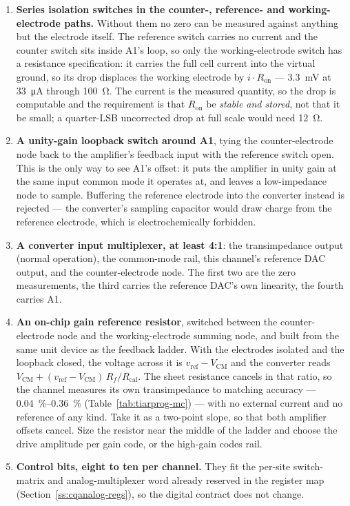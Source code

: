 \begin{enumerate}[label=C\arabic*., leftmargin=*, itemsep=2pt]
\item \textbf{Series isolation switches in the counter-, reference- and
  working-electrode paths.} Without them no zero can be measured against
  anything but the electrode itself. The reference switch carries no current and
  the counter switch sits inside A1's loop, so only the working-electrode switch
  has a resistance specification: it carries the full cell current into the
  virtual ground, so its drop displaces the working electrode by
  \(i\!\cdot\!R_{\mathrm{on}}\) --- \SI{3.3}{\milli\volt} at
  \SI{33}{\micro\ampere} through \SI{100}{\ohm}. The current is the measured
  quantity, so the drop is computable and the requirement is that
  \(R_{\mathrm{on}}\) be \emph{stable and stored}, not that it be small; a
  quarter-LSB uncorrected drop at full scale would need \SI{12}{\ohm}.
\item \textbf{A unity-gain loopback switch around A1}, tying the
  counter-electrode node back to the amplifier's feedback input with the
  reference switch open. This is the only way to see A1's offset: it puts the
  amplifier in unity gain at the same input common mode it operates at, and
  leaves a low-impedance node to sample. Buffering the reference electrode into
  the converter instead is rejected --- the converter's sampling capacitor would
  draw charge from the reference electrode, which is electrochemically
  forbidden.
\item \textbf{A converter input multiplexer, at least 4:1}: the transimpedance
  output (normal operation), the common-mode rail, this channel's reference DAC
  output, and the counter-electrode node. The first two are the zero
  measurements, the third carries the reference DAC's own linearity, the fourth
  carries A1.
\item \textbf{An on-chip gain reference resistor}, switched between the
  counter-electrode node and the working-electrode summing node, and built from
  the same unit device as the feedback ladder. With the electrodes isolated and
  the loopback closed, the voltage across it is \(v_{\mathrm{ref}} -
  V_{\mathrm{CM}}\) and the converter reads \(V_{\mathrm{CM}} +
  (v_{\mathrm{ref}} - V_{\mathrm{CM}})\,R_f/R_{\mathrm{cal}}\). The sheet
  resistance cancels in that ratio, so the channel measures its own
  transimpedance to matching accuracy --- \SIrange{0.04}{0.36}{\percent}
  (Table~\ref{tab:tiarprog-mc}) --- with no external current and no reference of
  any kind. Take it as a two-point slope, so that both amplifier offsets cancel.
  Size the resistor near the middle of the ladder and choose the drive amplitude
  per gain code, or the high-gain codes rail.
\item \textbf{Control bits, eight to ten per channel.} They fit the per-site
  switch-matrix and analog-multiplexer word already reserved in the register map
  (Section~\ref{ss:cqanalog-regs}), so the digital contract does not change.
\end{enumerate}

